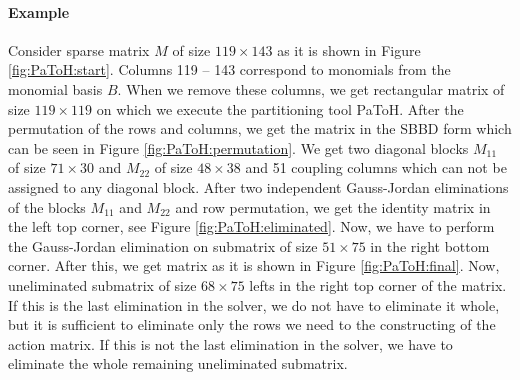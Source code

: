 \paragraph{Example}
Consider sparse matrix $M$ of size $119\times 143$ as it is shown in Figure \ref{fig:PaToH:start}. Columns 119 -- 143 correspond to monomials from the monomial basis $B$. When we remove these columns, we get rectangular matrix of size $119 \times 119$ on which we execute the partitioning tool PaToH. After the permutation of the rows and columns, we get the matrix in the SBBD form which can be seen in Figure \ref{fig:PaToH:permutation}. We get two diagonal blocks $M_{11}$ of size $71\times 30$ and $M_{22}$ of size $48 \times 38$ and 51 coupling columns which can not be assigned to any diagonal block. After two independent Gauss-Jordan eliminations of the blocks $M_{11}$ and $M_{22}$ and row permutation, we get the identity matrix in the left top corner, see Figure \ref{fig:PaToH:eliminated}. Now, we have to perform the Gauss-Jordan elimination on submatrix of size $51 \times 75$ in the right bottom corner. After this, we get matrix as it is shown in Figure \ref{fig:PaToH:final}. Now, uneliminated submatrix of size $68 \times 75$ lefts in the right top corner of the matrix. If this is the last elimination in the solver, we do not have to eliminate it whole, but it is sufficient to eliminate only the rows we need to the constructing of the action matrix. If this is not the last elimination in the solver, we have to eliminate the whole remaining uneliminated submatrix.

